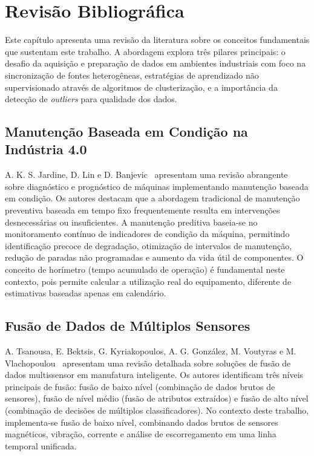 \chapter{Revisão Bibliográfica}
\label{chap:revisao}

Este capítulo apresenta uma revisão da literatura sobre os conceitos fundamentais que sustentam este trabalho. A abordagem explora três pilares principais: o desafio da aquisição e preparação de dados em ambientes industriais com foco na sincronização de fontes heterogêneas, estratégias de aprendizado não supervisionado através de algoritmos de clusterização, e a importância da detecção de \textit{outliers} para qualidade dos dados.

\section{Manutenção Baseada em Condição na Indústria 4.0}

A. K. S. Jardine, D. Lin e D. Banjevic~\cite{jardine2006review} apresentam uma revisão abrangente sobre diagnóstico e prognóstico de máquinas implementando manutenção baseada em condição. Os autores destacam que a abordagem tradicional de manutenção preventiva baseada em tempo fixo frequentemente resulta em intervenções desnecessárias ou insuficientes. A manutenção preditiva baseia-se no monitoramento contínuo de indicadores de condição da máquina, permitindo identificação precoce de degradação, otimização de intervalos de manutenção, redução de paradas não programadas e aumento da vida útil de componentes. O conceito de horímetro (tempo acumulado de operação) é fundamental neste contexto, pois permite calcular a utilização real do equipamento, diferente de estimativas baseadas apenas em calendário.

\section{Fusão de Dados de Múltiplos Sensores}

A. Tsanousa, E. Bektsis, G. Kyriakopoulos, A. G. González, M. Voutyras e M. Vlachopoulou~\cite{tsanousa2022review} apresentam uma revisão detalhada sobre soluções de fusão de dados multissensor em manufatura inteligente. Os autores identificam três níveis principais de fusão: fusão de baixo nível (combinação de dados brutos de sensores), fusão de nível médio (fusão de atributos extraídos) e fusão de alto nível (combinação de decisões de múltiplos classificadores). No contexto deste trabalho, implementa-se fusão de baixo nível, combinando dados brutos de sensores magnéticos, vibração, corrente e análise de escorregamento em uma linha temporal unificada.

